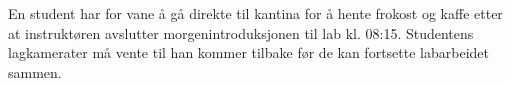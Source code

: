 En student har for vane å gå direkte til kantina for å hente frokost og kaffe etter at instruktøren avslutter morgenintroduksjonen til lab kl. 08:15.  Studentens lagkamerater må vente til han kommer tilbake før de kan fortsette labarbeidet sammen.
















